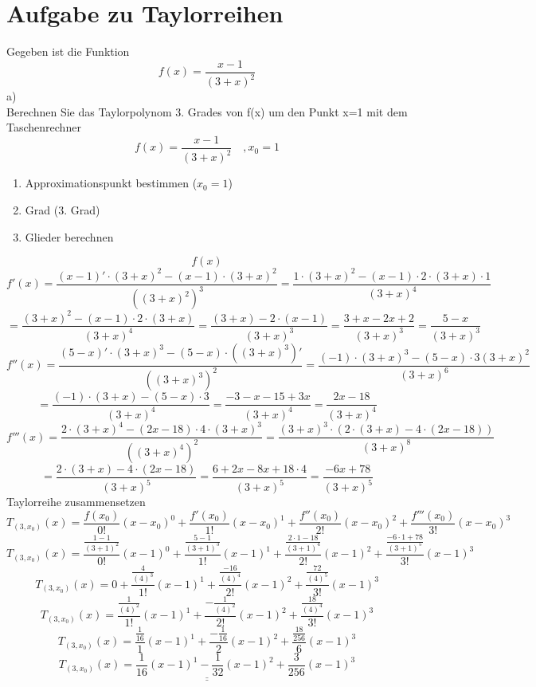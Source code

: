 \section{Aufgabe zu Taylorreihen}
Gegeben ist die Funktion 
\[ f(x) = \frac{x-1}{(3+x)^2} \]
a)\\
Berechnen Sie das Taylorpolynom 3. Grades von f(x) um den Punkt x=1 mit dem Taschenrechner
\[ f(x) = \frac{x - 1}{(3 + x)^2}\quad , x_0 = 1 \]
\begin{enumerate}
  \item Approximationspunkt bestimmen ($x_0 = 1$)
  \item Grad (3. Grad)
  \item Glieder berechnen
\end{enumerate}
\[ f(x) \]
\[ f'(x) = \frac{(x - 1)' \cdot (3 + x)^2 - (x - 1) \cdot (3 + x)^2}{((3 + x)^2)^3} = \frac{1 \cdot (3 + x)^2 - (x - 1) \cdot 2 \cdot (3 + x) \cdot 1}{(3 + x)^4} \]
\[ = \frac{(3 + x)^2 - (x - 1) \cdot 2 \cdot (3 + x)}{(3 + x)^4} = \frac{(3 + x) - 2 \cdot (x - 1)}{(3 + x)^3} = \frac{3 + x - 2x + 2}{(3 + x)^3} = \frac{5 - x}{(3 + x)^3} \]
\[ f''(x) = \frac{(5 - x)' \cdot (3 + x)^3 - (5 - x)\cdot((3 + x)^3)'}{((3 + x)^3)^2} = \frac{(-1) \cdot (3 + x)^3 - (5 - x)\cdot3(3 + x)^2}{(3 + x)^6} \]
\[ = \frac{(-1) \cdot (3 + x) - (5 - x) \cdot 3}{(3 + x)^4} = \frac{-3 - x - 15 + 3x}{(3 + x)^4} = \frac{2x - 18}{(3 + x)^4} \]
\[ f'''(x) = \frac{2 \cdot (3 + x)^4 - (2x - 18) \cdot 4 \cdot (3 + x)^3}{((3 + x)^4)^2} = \frac{(3 + x)^3 \cdot (2 \cdot (3 + x) - 4 \cdot (2x - 18))}{(3 + x)^8} \]
\[ = \frac{2 \cdot (3 + x) - 4 \cdot (2x - 18)}{(3 + x)^5} = \frac{6 + 2x - 8x + 18 \cdot 4}{(3 + x)^5} = \frac{-6x + 78}{(3 + x)^5} \]
Taylorreihe zusammensetzen
\[ T_{(3, x_0)}(x) = \frac{f(x_0)}{0!}(x - x_0)^0 + \frac{f'(x_0)}{1!}(x - x_0)^1 + \frac{f''(x_0)}{2!}(x - x_0)^2 + \frac{f'''(x_0)}{3!}(x - x_0)^3 \]
\[ T_{(3, x_0)}(x) = \frac{\frac{1-1}{(3+1)^2}}{0!}(x - 1)^0 + \frac{\frac{5 - 1}{(3 + 1)^3}}{1!}(x - 1)^1 + \frac{\frac{2\cdot1 - 18}{(3 + 1)^4}}{2!}(x - 1)^2 + \frac{\frac{-6\cdot1 + 78}{(3 + 1)^5}}{3!}(x - 1)^3 \]
\[ T_{(3, x_0)}(x) = 0 + \frac{\frac{4}{(4)^3}}{1!}(x - 1)^1 + \frac{\frac{-16}{(4)^4}}{2!}(x - 1)^2 + \frac{\frac{72}{(4)^5}}{3!}(x - 1)^3 \]
\[ T_{(3, x_0)}(x) = \frac{\frac{1}{(4)^2}}{1!}(x - 1)^1 + \frac{-\frac{1}{(4)^2}}{2!}(x - 1)^2 + \frac{\frac{18}{(4)^4}}{3!}(x - 1)^3 \]
\[ T_{(3, x_0)}(x) = \frac{\frac{1}{16}}{1}(x - 1)^1 + \frac{-\frac{1}{16}}{2}(x - 1)^2 + \frac{\frac{18}{256}}{6}(x - 1)^3 \]
\[ \underline{\underline{T_{(3, x_0)}(x) = \frac{1}{16}(x - 1)^1 - \frac{1}{32}(x - 1)^2 + \frac{3}{256}(x - 1)^3}} \]
